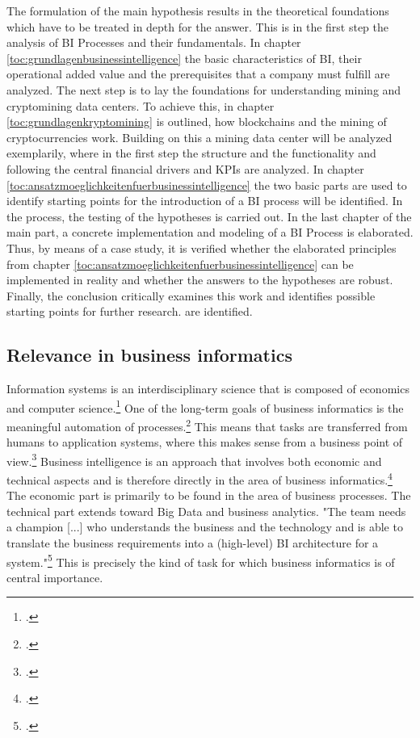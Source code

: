 The formulation of the main hypothesis results in the theoretical foundations which have to be treated in depth for the answer.
This is in the first step the analysis of \ac{BI} Processes and their fundamentals. In chapter \ref{toc:grundlagenbusinessintelligence}
the basic characteristics of \ac{BI}, their operational added value and the prerequisites that a company must fulfill are analyzed.
The next step is to lay the foundations for understanding mining and cryptomining data centers. To achieve this,
in chapter \ref{toc:grundlagenkryptomining} is outlined, how blockchains and the mining of cryptocurrencies work. Building on this
a mining data center will be analyzed exemplarily, where in the first step the structure and the functionality and following the central
financial drivers and \acp{KPI} are analyzed. In chapter \ref{toc:ansatzmoeglichkeitenfuerbusinessintelligence} the two
basic parts are used to identify starting points for the introduction of a \ac{BI} process will be identified. In the process, the testing of the
hypotheses is carried out. In the last chapter of the main part, a concrete implementation and modeling of a \ac{BI} Process
is elaborated. Thus, by means of a case study, it is verified whether the elaborated principles from chapter
\ref{toc:ansatzmoeglichkeitenfuerbusinessintelligence} can be implemented in reality and whether the answers to the hypotheses are robust.
Finally, the conclusion critically examines this work and identifies possible starting points for further research.
are identified.

\subsection{Relevance in business informatics} \label{toc:relevanzinderwirtschaftinformatik}

Information systems is an interdisciplinary science that is composed of economics and computer science.\footcite[Cf.][p. 5]{mertens2005grundzuge}
One of the long-term goals of business informatics is the meaningful
automation of processes.\footcite[Cf.][p. 4]{mertens2005grundzuge} This means that tasks are transferred from humans to application systems,
where this makes sense from a business point of view.\footcite[Cf.][p. 4]{mertens2005grundzuge}
Business intelligence is an approach that involves both economic and technical aspects and is therefore directly
in the area of business informatics.\footcite[Cf.][p. 102]{azma2012business} The economic part is primarily to be found in the area of business processes.
The technical part extends toward Big Data and business analytics. "The
team needs a champion [...] who understands the business and the technology and is able to translate the business requirements into a
(high-level) \ac{BI} architecture for a system."\footcite[][p. 27]{yeoh2010critical} This is precisely the kind of task for which business informatics
is of central importance.

